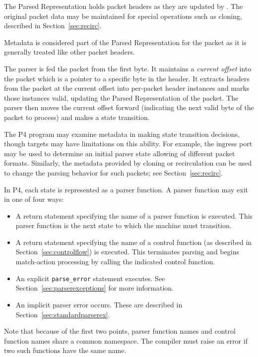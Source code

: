 \documentclass[12pt]{article}
\begin{document}
The Parsed Representation holds packet headers as they are updated by \matchaction. 
The original packet data may be maintained for special operations such as 
cloning, described in Section~\ref{sec:recirc}.

Metadata is considered part of the Parsed Representation for the packet as 
it is generally treated like other packet headers.


The parser is fed the packet from the first byte. It maintains a \textit{current 
offset} into the packet which is a pointer to a specific byte in the header. It 
extracts headers from the packet at the current offset into per-packet header 
instances and marks those instances valid, updating the Parsed Representation 
of the packet. The parser then moves the current offset forward (indicating 
the next valid byte of the packet to process) and makes a state transition.

The P4 program may examine metadata in making state transition decisions, 
though targets may have limitations on this ability.  For example, the ingress 
port may be used to determine an initial parser state allowing of different 
packet formats. Similarly, the metadata provided by cloning or recirculation 
can be used to change the parsing behavior for such packets; see 
Section~\ref{sec:recirc}.

In P4, each state is represented as a parser function. A parser function may 
exit in one of four ways:

\begin{itemize}
\item
A return statement specifying the name of a parser function is executed.  This 
parser function is the next state to which the machine must transition.
\item
A return statement specifying the name of a control function (as described 
in Section~\ref{sec:controlflow}) is executed. This terminates 
parsing and begins match-action processing by calling the indicated control 
function.
\item
An explicit \texttt{parse_error} statement executes. 
See Section~\ref{sec:parserexceptions} for more information.
\item
An implicit parser error occurs. These are described in 
Section~\ref{sec:standardparserex}.
\end{itemize}


Note that because of the first two points, parser function names and
control function names share a common namespace.  The compiler must
raise an error if two such functions have the same name.
\end{document}
